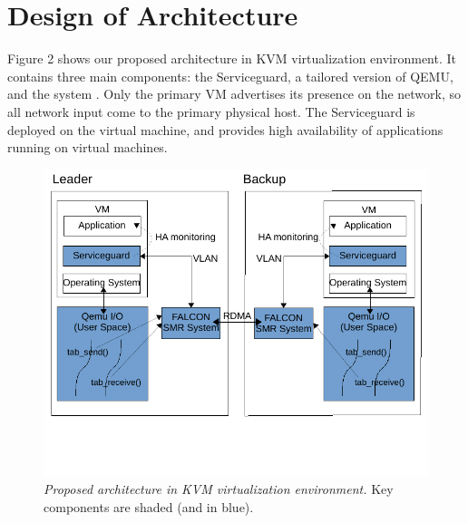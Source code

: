 \section{Design of Architecture} \label{sec:overview}

Figure 2 shows our proposed architecture in KVM virtualization environment. 
It contains three main components: the Serviceguard, a tailored version 
of QEMU, and the \smr system \smrsystem. 
Only the primary VM advertises its presence on the network, so all network input come 
to the primary physical host. 
The Serviceguard is deployed on the virtual machine, and provides high availability 
of applications running on virtual machines. 

\begin{figure}[t]
\centering
\includegraphics[width=.47\textwidth]{figures/arch}
\vspace{-.2in}
\caption{{\em Proposed architecture in KVM virtualization environment.} Key 
components are shaded (and in blue).} \label{fig:arc}
\vspace{.05in}
\end{figure}
